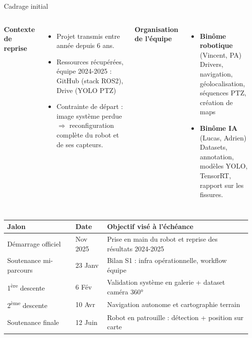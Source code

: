 \documentclass[aspectratio=169]{beamer}
\begin{document}
\begin{frame}{Cadrage initial}
    \begin{columns}[T]
        \textbf{Contexte de reprise}
        \begin{itemize}
            \item Projet transmis entre année depuis 6 ans.
            \item Ressources récupérées, équipe 2024-2025 : GitHub (stack ROS2), Drive (YOLO PTZ)
            \item Contrainte de départ : image système perdue $\Rightarrow$ reconfiguration complète du robot et de ses capteurs.
        \end{itemize}
        \textbf{Organisation de l'équipe}
        \begin{itemize}
            \item \textbf{Binôme robotique} (Vincent, PA)\\
            Drivers, navigation, géolocalisation, séquences PTZ, création de maps
            \item \textbf{Binôme IA} (Lucas, Adrien)\\
            Datasets, annotation, modèles YOLO, TensorRT, rapport sur les fissures.
        \end{itemize}
    \end{columns}
    \begin{table}
        \centering
        \small
        \begin{tabular}{|l|l|p{8.5cm}|}
            \hline
            \textbf{Jalon} & \textbf{Date} & \textbf{Objectif visé à l'échéance} \\
            \hline
            Démarrage officiel & Nov 2025 & Prise en main du robot et reprise des résultats 2024-2025 \\
            \hline
            Soutenance mi-parcours & 23 Janv & Bilan S1 : infra opérationnelle, workflow équipe \\
            \hline
            1\textsuperscript{ère} descente & 6 Fév & Validation système en galerie + dataset caméra 360° \\
            \hline
            2\textsuperscript{ème} descente & 10 Avr & Navigation autonome et cartographie terrain \\
            \hline
            Soutenance finale & 12 Juin & Robot en patrouille : détection + position sur carte \\
            \hline
        \end{tabular}
    \end{table}
\end{frame}
\end{document}
